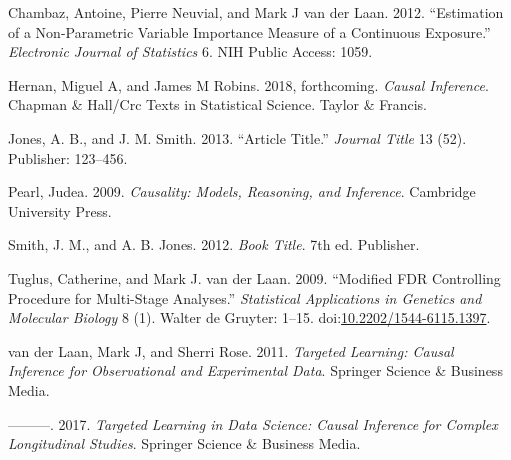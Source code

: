 \documentclass[9pt,a4paper,]{extarticle}
\theoremstyle{definition}
\theoremstyle{definition}
\theoremstyle{definition}
\theoremstyle{remark}
\begin{document}
\hypertarget{ref-chambaz2012estimation}{}
Chambaz, Antoine, Pierre Neuvial, and Mark J van der Laan. 2012.
``Estimation of a Non-Parametric Variable Importance Measure of a
Continuous Exposure.'' \emph{Electronic Journal of Statistics} 6. NIH
Public Access: 1059.

\hypertarget{ref-hernan2018causal}{}
Hernan, Miguel A, and James M Robins. 2018, forthcoming. \emph{Causal
Inference}. Chapman \& Hall/Crc Texts in Statistical Science. Taylor \&
Francis.

\hypertarget{ref-Smith:2013jd}{}
Jones, A. B., and J. M. Smith. 2013. ``Article Title.'' \emph{Journal
Title} 13 (52). Publisher: 123--456.

\hypertarget{ref-pearl2009causality}{}
Pearl, Judea. 2009. \emph{Causality: Models, Reasoning, and Inference}.
Cambridge University Press.

\hypertarget{ref-Smith:2012qr}{}
Smith, J. M., and A. B. Jones. 2012. \emph{Book Title}. 7th ed.
Publisher.

\hypertarget{ref-tuglus2009modified}{}
Tuglus, Catherine, and Mark J. van der Laan. 2009. ``Modified FDR
Controlling Procedure for Multi-Stage Analyses.'' \emph{Statistical
Applications in Genetics and Molecular Biology} 8 (1). Walter de
Gruyter: 1--15.
doi:\href{https://doi.org/10.2202/1544-6115.1397}{10.2202/1544-6115.1397}.

\hypertarget{ref-vdl2011targeted}{}
van der Laan, Mark J, and Sherri Rose. 2011. \emph{Targeted Learning:
Causal Inference for Observational and Experimental Data}. Springer
Science \& Business Media.

\hypertarget{ref-vdl2017targeted}{}
---------. 2017. \emph{Targeted Learning in Data Science: Causal
Inference for Complex Longitudinal Studies}. Springer Science \&
Business Media.
\end{document}
